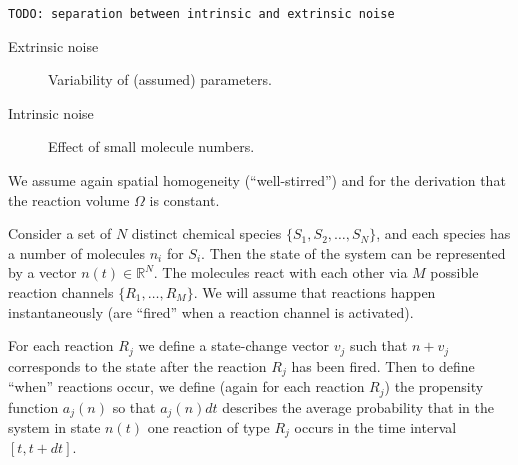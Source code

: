 \documentclass[a4paper]{article}
\newcommand{\todo}[1]{\texttt{TODO: #1}}
\theoremstyle{plain}
\theoremstyle{definition}
\theoremstyle{remark}
\begin{document}
\todo{separation between intrinsic and extrinsic noise}

\begin{description}
  \item[Extrinsic noise] Variability of (assumed) parameters.
  \item[Intrinsic noise] Effect of small molecule numbers.
\end{description}

We assume again spatial homogeneity (``well-stirred'') and for the derivation
that the reaction volume $\Omega$ is constant.

Consider a set of $N$ distinct chemical species $\{S_1, S_2, \ldots, S_N\}$,
and each species has a number of molecules $n_i$ for $S_i$. Then the state of
the system can be represented by a vector $n(t) \in \mathbb{R}^N$. The
molecules react with each other via $M$ possible reaction channels $\{R_1,
\ldots, R_M\}$. We will assume that reactions happen instantaneously (are
``fired'' when a reaction channel is activated).

For each reaction $R_j$ we define a state-change vector $v_j$ such that $n +
v_j$ corresponds to the state after the reaction $R_j$ has been fired. Then to
define ``when'' reactions occur, we define (again for each reaction $R_j$) the
propensity function $a_j(n)$ so that $a_j(n) dt$ describes the average
probability that in the system in state $n(t)$ one reaction of type $R_j$
occurs in the time interval $[t, t + dt]$.
\end{document}
